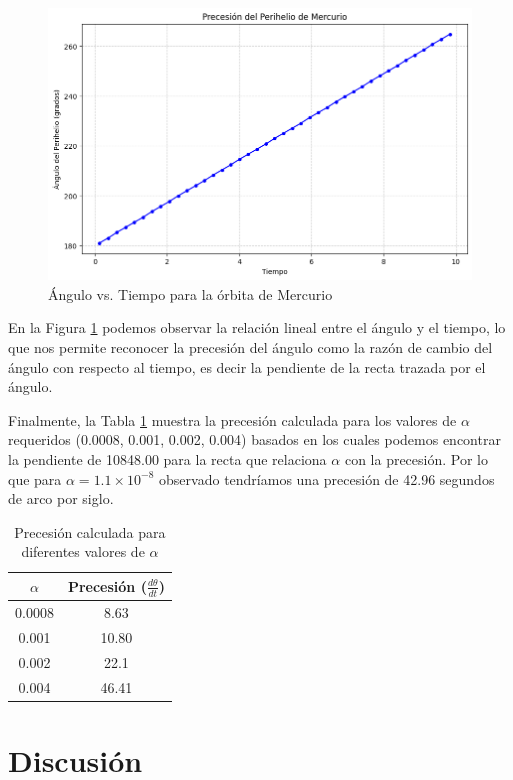 \documentclass[twocolumn]{article}
\begin{document}
\begin{figure}[H]
\centering
\includegraphics[width=0.9\columnwidth]{./figures/precesion_mercurio.png}
\caption{Ángulo vs. Tiempo para la órbita de Mercurio}
\label{fig:angulo_vs_tiempo}
\end{figure}

En la Figura \ref{fig:angulo_vs_tiempo} podemos observar la relación lineal entre el ángulo y el tiempo, lo que nos permite reconocer la precesión del ángulo como la razón de cambio del ángulo con respecto al tiempo, es decir la pendiente de la recta trazada por el ángulo.

Finalmente, la Tabla \ref{tab:precesion} muestra la precesión calculada para los valores de $\alpha$ requeridos (0.0008, 0.001, 0.002, 0.004) basados en los cuales podemos encontrar la pendiente de 10848.00 para la recta que relaciona $\alpha$ con la precesión. Por lo que para $\alpha = 1.1 \times 10^{-8}$ observado tendríamos una precesión de 42.96 segundos de arco por siglo.

\begin{table}[H]
\centering
\caption{Precesión calculada para diferentes valores de $\alpha$}
\label{tab:precesion}
\begin{tabular}{@{}cc@{}}
\toprule
$\alpha$ & Precesión ($\frac{d\theta}{dt}$) \\
\midrule
0.0008 & 8.63 \\
0.001 & 10.80 \\
0.002 & 22.1 \\
0.004 & 46.41 \\
\bottomrule
\end{tabular}
\end{table}

\section{Discusión}
\end{document}
